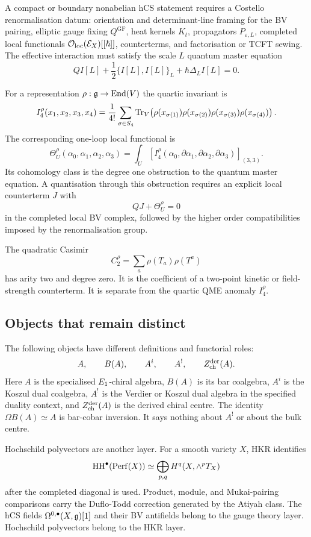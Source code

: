 A compact or boundary nonabelian hCS statement requires a Costello
renormalisation datum: orientation and determinant-line framing for the
BV pairing, elliptic gauge fixing $Q^{\mathrm{GF}}$, heat kernels
$K_t$, propagators $P_{\varepsilon,L}$, completed local functionals
$\mathcal{O}_{\mathrm{loc}}(\mathcal{E}_X)[[\hbar]]$, counterterms, and factorisation
or TCFT sewing. The effective interaction must satisfy the scale $L$
quantum master equation
\[
  QI[L]
  +\frac12\{I[L],I[L]\}_L
  +\hbar\Delta_L I[L]
  =
  0.
\]

For a representation $\rho:\mathfrak{g}\to\operatorname{End}(V)$ the quartic
invariant is
\[
  I_4^\rho(x_1,x_2,x_3,x_4)
  =
  \frac1{4!}\sum_{\sigma\in S_4}
  \operatorname{Tr}_V\!\left(
    \rho(x_{\sigma(1)})\rho(x_{\sigma(2)})
    \rho(x_{\sigma(3)})\rho(x_{\sigma(4)})
  \right).
\]
The corresponding one-loop local functional is
\[
  \Theta^\rho_U(\alpha_0,\alpha_1,\alpha_2,\alpha_3)
  =
  \int_U
  \left[
    I_4^\rho(
      \alpha_0,\partial\alpha_1,\partial\alpha_2,\partial\alpha_3
    )
  \right]_{(3,3)} .
\]
Its cohomology class is the degree one obstruction to the quantum
master equation. A quantisation through this obstruction requires an
explicit local counterterm $J$ with
\[
  QJ+\Theta^\rho_U=0
\]
in the completed local BV complex, followed by the higher order
compatibilities imposed by the renormalisation group.

The quadratic Casimir
\[
  C_2^\rho=\sum_a \rho(T_a)\rho(T^a)
\]
has arity two and degree zero. It is the coefficient of a two-point
kinetic or field-strength counterterm. It is separate from the quartic
QME anomaly $I_4^\rho$.

\subsection{Objects that remain distinct}

The following objects have different definitions and functorial roles:
\[
  A,\qquad B(A),\qquad A^i,\qquad A^!,\qquad Z^{\mathrm{der}}_{\mathrm{ch}}(A).
\]
Here $A$ is the specialised $E_1$-chiral algebra, $B(A)$ is its bar
coalgebra, $A^i$ is the Koszul dual coalgebra, $A^!$ is the Verdier or
Koszul dual algebra in the specified duality context, and
$Z^{\mathrm{der}}_{\mathrm{ch}}(A)$ is the derived chiral centre. The identity
$\Omega B(A)\simeq A$ is bar-cobar inversion. It says nothing about
$A^!$ or about the bulk centre.

Hochschild polyvectors are another layer. For a smooth variety $X$, HKR
identifies
\[
  \mathrm{HH}^\bullet(\operatorname{Perf}(X))
  \simeq
  \bigoplus_{p,q} H^q(X,\wedge^p T_X)
\]
after the completed diagonal is used. Product, module, and Mukai-pairing
comparisons carry the Duflo-Todd correction generated by the Atiyah
class. The hCS fields $\Omega^{0,\bullet}(X,\mathfrak{g})[1]$ and their BV
antifields belong to the gauge theory layer. Hochschild polyvectors
belong to the HKR layer.

